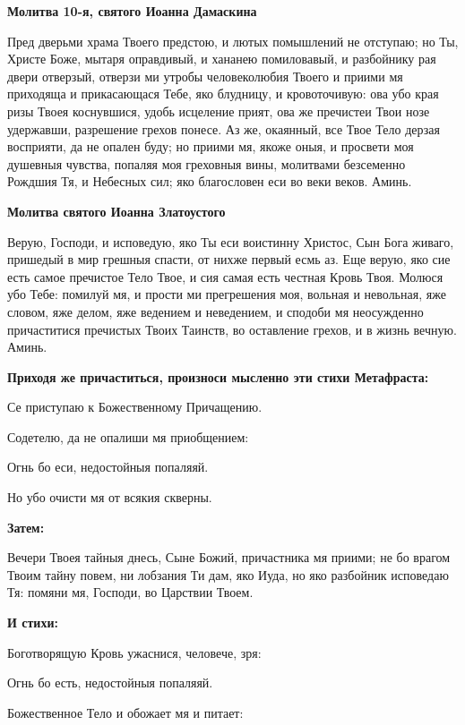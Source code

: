 \bfseries Молитва 10-я, святого Иоанна Дамаскина\normalfont{}


Пред дверьми храма Твоего предстою, и лютых помышлений не отступаю; но Ты, Христе Боже, мытаря оправдивый, и хананею помиловавый, и разбойнику рая двери отверзый, отверзи ми утробы человеколюбия Твоего и приими мя приходяща и прикасающася Тебе, яко блудницу, и кровоточивую: ова убо края ризы Твоея коснувшися, удобь исцеление прият, ова же пречистеи Твои нозе удержавши, разрешение грехов понесе. Аз же, окаянный, все Твое Тело дерзая восприяти, да не опален буду; но приими мя, якоже оныя, и просвети моя душевныя чувства, попаляя моя греховныя вины, молитвами безсеменно Рождшия Тя, и Небесных сил; яко благословен еси во веки веков. Аминь.




\bfseries Молитва святого Иоанна Златоустого\normalfont{}


Верую, Господи, и исповедую, яко Ты еси воистинну Христос, Сын Бога живаго, пришедый в мир грешныя спасти, от нихже первый есмь аз. Еще верую, яко сие есть самое пречистое Тело Твое, и сия самая есть честная Кровь Твоя. Молюся убо Тебе: помилуй мя, и прости ми прегрешения моя, вольная и невольная, яже словом, яже делом, яже ведением и неведением, и сподоби мя неосужденно причаститися пречистых Твоих Таинств, во оставление грехов, и в жизнь вечную. Аминь.




\bfseries Приходя же причаститься, произноси мысленно эти стихи Метафраста:\normalfont{}


Се приступаю к Божественному Причащению.


Содетелю, да не опалиши мя приобщением:


Огнь бо еси, недостойныя попаляяй.


Но убо очисти мя от всякия скверны.




\bfseries Затем:\normalfont{}


Вечери Твоея тайныя днесь, Сыне Божий, причастника мя приими; не бо врагом Твоим тайну повем, ни лобзания Ти дам, яко Иуда, но яко разбойник исповедаю Тя: помяни мя, Господи, во Царствии Твоем.




\bfseries И стихи:\normalfont{}


Боготворящую Кровь ужаснися, человече, зря:


Огнь бо есть, недостойныя попаляяй.


Божественное Тело и обожает мя и питает:


